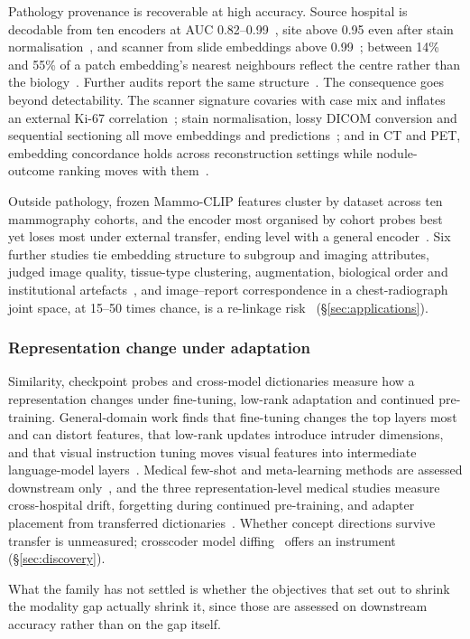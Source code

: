 Pathology provenance is recoverable at high accuracy. Source hospital is decodable from ten encoders at
AUC 0.82--0.99~\cite{zhang2025hospital}, site above 0.95 even after stain
normalisation~\cite{kmen2026robust}, and scanner from slide embeddings above
0.99~\cite{murchan2024deep}; between 14\% and 55\% of a patch embedding's
nearest neighbours reflect the centre rather than the
biology~\cite{saueressig2025histology,gustafsson2024evaluating}. Further audits report the same
structure~\cite{jung2026foundation,shafique2026investigating,esbri2025benchmarking}.
The consequence goes beyond detectability. The scanner signature covaries with case mix and inflates an
external Ki-67 correlation~\cite{jung2026foundation}; stain normalisation, lossy DICOM conversion and
sequential sectioning all move embeddings and
predictions~\cite{wolflein2023benchmarking,mayer2025lossy,balan2025reproducibility}; and in CT and PET,
embedding concordance holds across reconstruction settings while nodule-outcome ranking moves with
them~\cite{park2025evaluating,farquhar2026pretraining}.

Outside pathology, frozen Mammo-CLIP features cluster by dataset across ten mammography cohorts, and
the encoder most organised by cohort probes best yet loses most under external transfer, ending level
with a general encoder~\cite{germani2025bias}. Six further studies tie embedding structure to subgroup
and imaging attributes, judged image quality, tissue-type clustering, augmentation, biological order and
institutional
artefacts~\cite{alloula2025representation,ouaari2026assessing,fournier2026prognostic,elphick2024are,vig2026do,zhang2026auditing},
and image--report correspondence in a chest-radiograph joint space, at 15--50 times chance, is a
re-linkage risk~\cite{tayebiarasteh2026crossmodal} (\S\ref{sec:applications}).

\subsubsection{Representation change under adaptation}

Similarity, checkpoint probes and cross-model dictionaries measure how a representation changes under
fine-tuning, low-rank adaptation and continued pre-training. General-domain work finds that fine-tuning
changes the top layers most and can distort features, that low-rank updates introduce intruder
dimensions, and that visual instruction tuning moves visual features into intermediate language-model
layers~\cite{merchant2020what,zhou2021closer,kumar2022fine,lee2022surgical,raghu2019rapid,biderman2024lora,shuttleworth2024lora,palacios2026visual,verma2024cross}.
Medical few-shot and meta-learning methods are assessed downstream only~\cite{bo2025famnet,wang2025task},
and the three representation-level medical studies measure cross-hospital drift, forgetting during
continued pre-training, and adapter placement from transferred
dictionaries~\cite{theofilou2025stable,zoellin2024block,sadanandan2026mechanistically}. Whether concept
directions survive transfer is unmeasured; crosscoder model diffing~\cite{minder2025overcoming} offers
an instrument (\S\ref{sec:discovery}).

What the family has not settled is whether the objectives that set out to shrink the modality gap
actually shrink it, since those are assessed on downstream accuracy rather than on the gap itself.
